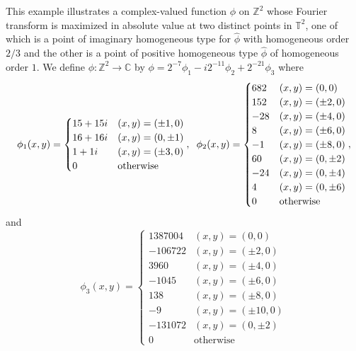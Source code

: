\documentclass[smallextended]{svjour3}
\theoremstyle{remark}
\begin{document}

\begin{example}\normalfont
This example illustrates a complex-valued function $\phi$ on $\mathbb{Z}^2$ whose Fourier transform is maximized in absolute value at two distinct points in $\mathbb{T}^2$, one of which is a point of imaginary homogeneous type for $\widehat{\phi}$ with homogeneous order $2/3$ and the other is a point of positive homogeneous type $\widehat{\phi}$ of homogeneous order $1$. We define $\phi: \mathbb{Z}^2 \to \mathbb{C}$ by $\phi=2^{-7}\phi_1-i2^{-11}\phi_2+2^{-21}\phi_3$ where
\begin{equation*}
    \phi_1(x,y)=\begin{cases}
    15 + 15i &(x,y) = (\pm 1,0)\\
    16 + 16i &(x,y) = (0, \pm 1)\\
     1 + 1i &(x,y) = (\pm 3,0)\\
    0 &\mbox{otherwise}
    \end{cases},
    \hspace{0.2cm}
    \phi_2(x,y) = 
    \begin{cases}
    682 &(x,y) = (0,0)\\
    152  &(x,y) = (\pm 2,0)\\
    -28  &(x,y) = (\pm 4,0)\\
    8 &(x,y) = (\pm 6, 0)\\
    -1 &(x,y) = (\pm 8, 0)\\
    60  &(x,y) = (0, \pm 2)\\
    -24 &(x,y) = (0,\pm 4)\\
    4 &(x,y) = (0,\pm 6)\\
    0 &\mbox{otherwise}
    \end{cases},
\end{equation*}
and
\begin{equation*}
    \phi_3(x,y) = 
    \begin{cases}
    1387004 &(x,y) = (0,0)\\
    -106722 &(x,y) = (\pm 2,0)\\
    3960 &(x,y) = (\pm 4,0)\\
    -1045 &(x,y) = (\pm 6, 0)\\
    138  &(x,y) = (\pm 8, 0)\\
    -9 &(x,y) = (\pm 10, 0)\\
    -131072 &(x,y) = (0, \pm 2)\\
    0 &\mbox{otherwise}
    \end{cases}

\end{equation*}
\end{example}
\end{document}

